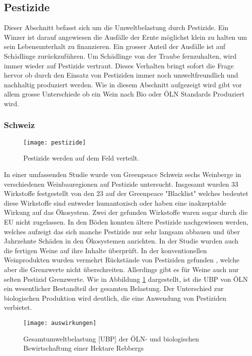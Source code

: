 \subsection{Pestizide}
Dieser Abschnitt befasst sich um die Umweltbelastung durch Pestizide. Ein Winzer ist darauf angewiesen die Ausfälle der Ernte möglichst klein zu halten um sein Lebensunterhalt zu finanzieren. Ein grosser Anteil der Ausfälle ist auf Schädlinge zurückzuführen. Um Schädlinge von der Traube fernzuhalten, wird immer wieder auf Pestizide vertraut. Dieses Verhalten bringt sofort die Frage hervor ob durch den Einsatz von Pestiziden immer noch umweltfreundlich und nachhaltig produziert werden. Wie in diesem Abschnitt aufgezeigt wird gibt vor allem grosse Unterschiede ob ein Wein nach Bio oder ÖLN Standards Produziert wird.
\subsubsection{Schweiz}
\begin{wrapfigure}{r}{10cm}
	\texttt{[image: pestizide]}
	\caption{Pestizide werden auf dem Feld verteilt.}
\end{wrapfigure}
In einer umfassenden Studie\cite{_reportweintesting-1.pdf} wurde von Greenpeace Schweiz sechs Weinberge in verschiedenen Weinbauregionen auf Pestizide untersucht. Insgesamt wurden 33 Wirkstoffe festgestellt von den 23 auf der Greenpeace "Blacklist" welches bedeutet diese Wirkstoffe sind entweder humantoxisch oder haben eine inakzeptable Wirkung auf das Ökosystem. Zwei der gefunden Wirkstoffe waren sogar durch die EU nicht zugelassen. In den Böden konnten ältere Pestizide nachgewiesen werden, welches aufzeigt das sich manche Pestizide nur sehr langsam abbauen und über Jahrzehnte Schäden in den Ökosystemen anrichten. In der Studie wurden auch die fertigen Weine auf ihre Inhalte überprüft. In der konventionellen Weinprodukten wurden vermehrt Rückstände von Pestiziden gefunden , welche aber die Grenzwerte nicht überschreiten. Allerdings gibt es für Weine auch nur selten Pestizid Grenzwerte. Wie in Abbildung \ref{fig:ha} dargestellt, ist die UBP von ÖLN ein wesentlicher Bestandteil der gesamten Belastung. Der Unterschied zur biologischen Produktion wird deutlich, die eine Anwendung von Pestiziden verbietet.
 \begin{figure}[H]	
	\centering
	\texttt{[image: auswirkungen]}
	\caption{Gesamtumweltbelastung [UBP] der ÖLN- und biologischen Bewirtschaftung einer Hektare Rebbergs}
	\label{fig:ha}
\end{figure}

